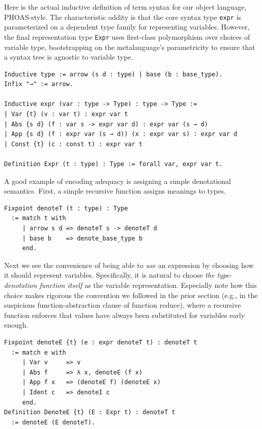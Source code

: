 Here is the actual inductive definition of term syntax for our object language, PHOAS-style.
The characteristic oddity is that the core syntax type \texttt{expr} is parameterized on a dependent type family for representing variables.
However, the final representation type \texttt{Expr} uses first-class polymorphism over choices of variable type, bootstrapping on the metalanguage's parametricity to ensure that a syntax tree is agnostic to variable type.
\begin{verbatim}
Inductive type := arrow (s d : type) | base (b : base_type).
Infix "→" := arrow.

Inductive expr (var : type -> Type) : type -> Type :=
| Var {t} (v : var t) : expr var t
| Abs {s d} (f : var s -> expr var d) : expr var (s → d)
| App {s d} (f : expr var (s → d)) (x : expr var s) : expr var d
| Const {t} (c : const t) : expr var t

Definition Expr (t : type) : Type := forall var, expr var t.
\end{verbatim}

A good example of encoding adequacy is assigning a simple denotational semantics.
First, a simple recursive function assigns meanings to types.
\begin{verbatim}
Fixpoint denoteT (t : type) : Type
  := match t with
     | arrow s d => denoteT s -> denoteT d
     | base b    => denote_base_type b
     end.
\end{verbatim}

Next we see the convenience of being able to \emph{use} an expression by choosing how it should represent variables.
Specifically, it is natural to choose \emph{the type-denotation function itself} as the variable representation.
Especially note how this choice makes rigorous the convention we followed in the prior section (e.g., in the suspicious function-abstraction clause of function reduce), where a recursive function enforces that values have always been substituted for variables early enough.
\begin{verbatim}
Fixpoint denoteE {t} (e : expr denoteT t) : denoteT t
  := match e with
     | Var v     => v
     | Abs f     => λ x, denoteE (f x)
     | App f x   => (denoteE f) (denoteE x)
     | Ident c   => denoteI c
     end.
Definition DenoteE {t} (E : Expr t) : denoteT t
  := denoteE (E denoteT).
\end{verbatim}

